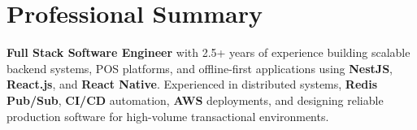 \section{Professional Summary}
\vspace{2pt}

\textbf{Full Stack Software Engineer} with 2.5+ years of experience building scalable backend systems, POS platforms, and offline-first applications using \textbf{NestJS}, \textbf{React.js}, and \textbf{React Native}. Experienced in distributed systems, \textbf{Redis Pub/Sub}, \textbf{CI/CD} automation, \textbf{AWS} deployments, and designing reliable production software for high-volume transactional environments.
